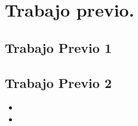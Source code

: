 \documentclass[12pt, a4paper, titlepage]{report}
\begin{document}
		\section{Trabajo previo.}
    	    
        \lipsum[3] 
            
            \subsection{Trabajo Previo 1}
        \lipsum[3] 
                
            \subsection{Trabajo Previo 2}
        \lipsum[3]
                \begin{itemize}
                    \item         \lipsum[2] 
                    \item         \lipsum[2] 
                \end{itemize}
            
 
            \lipsum[2] 
		
\end{document}
